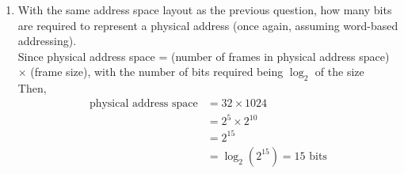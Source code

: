\documentclass[paper=usletter, fontsize=12pt]{article}
\begin{document}
\begin{enumerate}
        \item With the same address space layout as the previous question, how
        many bits are required to represent a physical address (once again,
        assuming word-based addressing).\\
        Since physical address space = (number of frames in physical address
        space) $\times$ (frame size), with the number of bits required being
        $\log_2$ of the size\\
        Then,
        \begin{align*}
            \text{physical address space} & = 32 \times 1024\\
            & = 2^{5} \times 2^{10}\\
            & = 2^{15}\\
            & = \log_2(2^{15}) = 15 \text{ bits}
        \end{align*}


    \end{enumerate}
\end{document}
